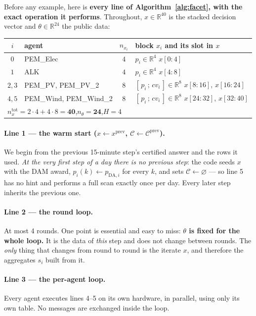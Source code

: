 \documentclass[11pt, letterpaper]{article}
\begin{document}
\medskip
Before any example, here is \textbf{every line of Algorithm~\ref{alg:facet}, with the exact operation
it performs}. Throughout, $x\in\mathbb R^{40}$ is the stacked decision vector and $\theta\in\mathbb
R^{24}$ the public data:
\begin{center}\small
\begin{tabular}{clcl}
\toprule
$i$ & agent & $n_{x_i}$ & block $x_i$ and its slot in $x$\\
\midrule
$0$ & PEM\_Elec    & $4$ & $p_i\in\mathbb R^{4}$ \hfill $x[0{:}4]$\\
$1$ & ALK          & $4$ & $p_i\in\mathbb R^{4}$ \hfill $x[4{:}8]$\\
$2,3$ & PEM\_PV, PEM\_PV\_2     & $8$ & $[\,p_i\,;\,cv_i\,]\in\mathbb R^{8}$ \hfill $x[8{:}16]$, $x[16{:}24]$\\
$4,5$ & PEM\_Wind, PEM\_Wind\_2 & $8$ & $[\,p_i\,;\,cv_i\,]\in\mathbb R^{8}$ \hfill $x[24{:}32]$, $x[32{:}40]$\\
\midrule
\multicolumn{4}{l}{$n_x^{\mathrm{tot}}=2\cdot4+4\cdot8=\mathbf{40}$,\qquad $n_\theta=\mathbf{24}$,\qquad $H=4$}\\
\bottomrule
\end{tabular}
\end{center}

\paragraph{Line 1 --- the warm start ($x\gets x^{\mathrm{prev}}$, $\mathcal C\gets\mathcal C^{\mathrm{prev}}$).}
We begin from the previous 15-minute step's certified answer and the rows it used. \emph{At the very
first step of a day there is no previous step}: the code seeds $x$ with the DAM award,
$p_i(k)\gets p_{\mathrm{DA},i}$ for every $k$, and sets $\mathcal C\gets\varnothing$ --- so line 5 has
no hint and performs a full scan exactly once per day. Every later step inherits the previous one.

\paragraph{Line 2 --- the round loop.}
At most 4 rounds. One point is essential and easy to miss: \textbf{$\theta$ is fixed for the whole
loop.} It is the data of \emph{this} step and does not change between rounds. The \emph{only} thing
that changes from round to round is the iterate $x$, and therefore the aggregates $s_i$ built from it.

\paragraph{Line 3 --- the per-agent loop.}
Every agent executes lines 4--5 on its own hardware, in parallel, using only its own table. No
messages are exchanged inside the loop.
\end{document}
